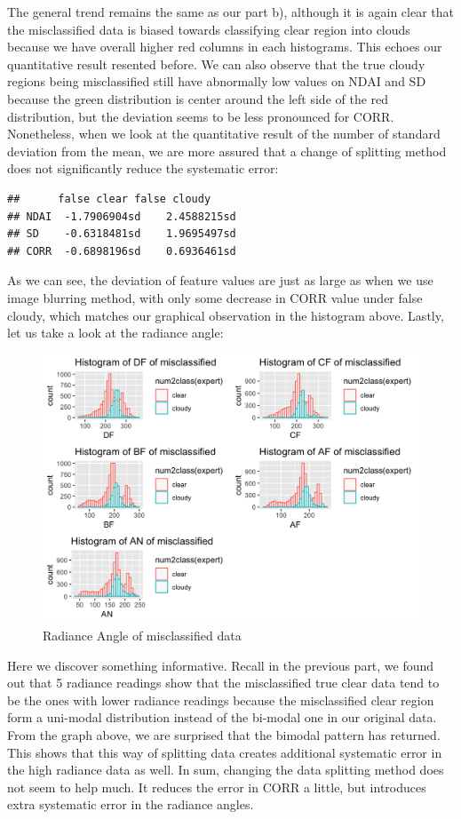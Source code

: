 \documentclass[jou]{apa}%
\begin{document}
The general trend remains the same as our part b), although it is again clear that the misclassified data is biased towards classifying clear region into clouds because we have overall higher red columns in each histograms. This echoes our quantitative result resented before. We can also observe that the true cloudy regions being misclassified still have abnormally low values on NDAI and SD because the green distribution is center around the left side of the red distribution, but the deviation seems to be less pronounced for CORR. Nonetheless, when we look at the quantitative result of the number of standard deviation from the mean, we are more assured that a change of splitting method does not significantly reduce the systematic error:
\begin{verbatim}
##      false clear false cloudy
## NDAI  -1.7906904sd    2.4588215sd
## SD    -0.6318481sd    1.9695497sd
## CORR  -0.6898196sd    0.6936461sd
\end{verbatim}
As we can see, the deviation of feature values are just as large as when we use image blurring method, with only some decrease in CORR value under false cloudy, which matches our graphical observation in the histogram above. Lastly, let us take a look at the radiance angle:
\begin{figure}[H] \centering\hspace*{-0.5cm}\includegraphics[scale=0.2,]{radiancesplit}\caption{Radiance Angle of misclassified data}\end{figure}
Here we discover something informative. Recall in the previous part, we found out that 5 radiance readings show that the misclassified true clear data tend to be the ones with lower radiance readings because the misclassified clear region form a uni-modal distribution instead of the bi-modal one in our original data. From the graph above, we are surprised that the bimodal pattern has returned. This shows that this way of splitting data creates additional systematic error in the high radiance data as well. In sum, changing the data splitting method does not seem to help much. It reduces the error in CORR a little, but introduces extra systematic error in the radiance angles.
\end{document}
